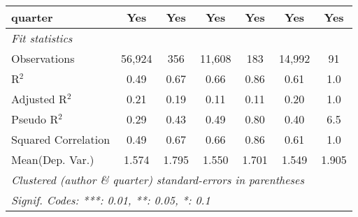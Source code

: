 \begin{tabular}{lcccccc}
   quarter                                                    & Yes            & Yes           & Yes            & Yes         & Yes           & Yes\\  
   \midrule
   \emph{Fit statistics}\\
   Observations                                               & 56,924         & 356           & 11,608         & 183         & 14,992        & 91\\  
   R$^2$                                                      & 0.49           & 0.67          & 0.66           & 0.86        & 0.61          & 1.0\\  
   Adjusted R$^2$                                             & 0.21           & 0.19          & 0.11           & 0.11        & 0.20          & 1.0\\  
   Pseudo R$^2$                                               & 0.29           & 0.43          & 0.49           & 0.80        & 0.40          & 6.5\\  
   Squared Correlation                                        & 0.49           & 0.67          & 0.66           & 0.86        & 0.61          & 1.0\\  
Mean(Dep. Var.) & 1.574 & 1.795 & 1.550 & 1.701 & 1.549 & 1.905 \\
   \midrule \midrule
   \multicolumn{7}{l}{\emph{Clustered (author \& quarter) standard-errors in parentheses}}\\
   \multicolumn{7}{l}{\emph{Signif. Codes: ***: 0.01, **: 0.05, *: 0.1}}\\
\end{tabular}
\par\endgroup
